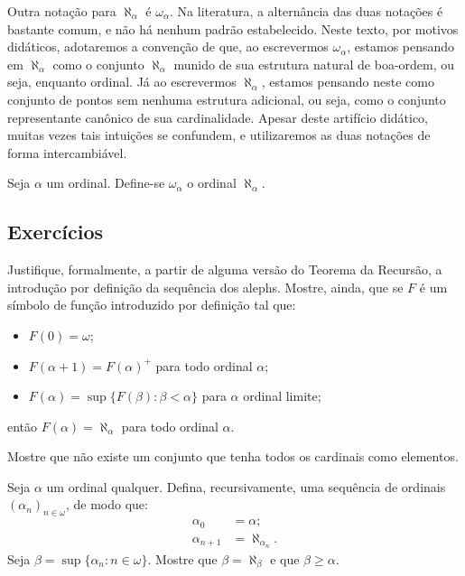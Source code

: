 Outra notação para $\aleph_\alpha$ é $\omega_\alpha$.
Na literatura, a alternância das duas notações é bastante comum, e não há nenhum padrão estabelecido.
Neste texto, por motivos didáticos, adotaremos a convenção de que, ao escrevermos $\omega_\alpha$, estamos pensando em $\aleph_\alpha$ como o conjunto $\aleph_\alpha$ munido de sua estrutura natural de boa-ordem, ou seja, enquanto ordinal.
Já ao escrevermos $\aleph_\alpha$, estamos pensando neste como conjunto de pontos sem nenhuma estrutura adicional, ou seja, como o conjunto representante canônico de sua cardinalidade.
Apesar deste artifício didático, muitas vezes tais intuições se confundem, e utilizaremos as duas notações de forma intercambiável.

\begin{definition}
    Seja $\alpha$ um ordinal.
    Define-se $\omega_\alpha$ o ordinal $\aleph_\alpha$.
\end{definition}

\subsection*{Exercícios}
\begin{exercise}
Justifique, formalmente, a partir de alguma versão do Teorema da Recursão, a introdução por definição da sequência dos alephs.
Mostre, ainda, que se $F$ é um símbolo de função introduzido por definição tal que:
\begin{itemize}
    \item $F(0)= \omega$;
    \item $F(\alpha+1) = F(\alpha)^+$ para todo ordinal $\alpha$;
    \item $F(\alpha)= \sup\{F(\beta) : \beta < \alpha\}$ para $\alpha$ ordinal limite;
\end{itemize}
então $F(\alpha) = \aleph_\alpha$ para todo ordinal $\alpha$.
\end{exercise}
\begin{exercise}
    Mostre que não existe um conjunto que tenha todos os cardinais como elementos.
\end{exercise}
\begin{exercise}
    Seja $\alpha$ um ordinal qualquer.
    Defina, recursivamente, uma sequência de ordinais $(\alpha_n)_{n\in\omega}$, de modo que:
    \begin{align*}
        \alpha_0 & = \alpha; \\
        \alpha_{n+1} & = \aleph_{\alpha_n}.
    \end{align*}
    Seja $\beta=\sup\{\alpha_n : n\in\omega\}$.
    Mostre que $\beta=\aleph_\beta$ e que $\beta\geq\alpha$.
\end{exercise}

